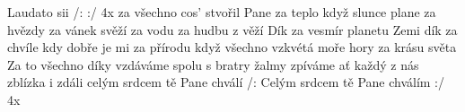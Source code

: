 \begin{TEXT}{Laudato sii}
\REFREN  /:  :/ 4x 
\SLOKA {} za všechno cos' stvořil Pane \NL
{} za teplo když slunce plane \NL
{} za hvězdy za vánek svěží \NL
{} za vodu za hudbu z věží 
\SLOKA Dík za vesmír planetu Zemi \NL
dík za chvíle kdy dobře je mi \NL
za přírodu když všechno vzkvétá \NL
moře hory za krásu světa 
\SLOKA Za to všechno díky vzdáváme \NL
spolu s bratry žalmy zpíváme \NL
ať každý z nás zblízka i zdáli \NL
celým srdcem tě Pane chválí
\SLOKA* /: Celým srdcem tě Pane chválím :/ 4x
\end{TEXT}
